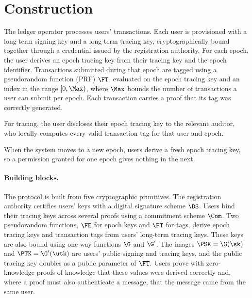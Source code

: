 \section{Construction}\label{sec:txid-construction}

The ledger operator processes users'
transactions. Each user is provisioned with a long-term signing key and a
long-term tracing key, cryptographically bound together through a credential issued
by the registration authority. For each epoch, the user derives an epoch tracing
key from their tracing key and the epoch identifier. Transactions submitted
during that epoch are tagged using a pseudorandom function (PRF) $\FT$, evaluated on the epoch tracing key
and an index in the range $[0,\Max)$, where $\Max$ bounds the number of
transactions a user can submit per epoch. Each transaction carries a proof that
its tag was correctly generated.

For tracing, the user discloses their epoch tracing key to the relevant auditor,
who locally computes every valid transaction tag for that user and epoch.

When the system moves to a new epoch, users derive a fresh epoch tracing key,
so a permission granted for one epoch gives nothing in the next.

\paragraph{Building blocks.} The protocol is built from five cryptographic
primitives. The registration authority certifies users'
keys with a digital signature scheme $\DS$.  Users bind their tracing keys
across several proofs using a commitment scheme $\Com$. Two pseudorandom
functions, $\FE$ for epoch keys and $\FT$ for tags, derive epoch tracing keys
and transaction tags from users' long-term tracing keys. These keys are also
bound using one-way functions $\G$ and $\G'$. The images $\PSK = \G(\sk)$ and $\PTK = \G'(\utk)$ are
users' public signing and tracing keys, and the public tracing key doubles as a
public parameter of $\FT$. Users prove with zero-knowledge proofs of knowledge
that these values were derived correctly and, where a proof must also
authenticate a message, that the message came from the same user.

